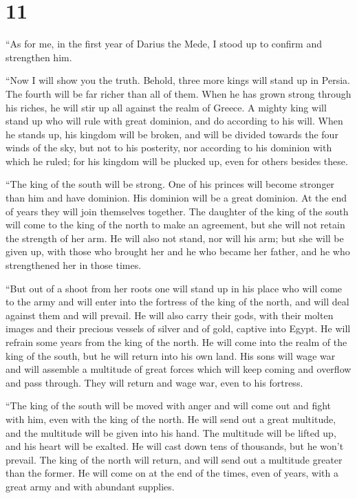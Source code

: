 \hypertarget{section-10}{%
\section{11}\label{section-10}}

 ``As for me, in the first year of Darius the Mede, I stood
up to confirm and strengthen him.

 ``Now I will show you the truth. Behold, three more kings
will stand up in Persia. The fourth will be far richer than all of them.
When he has grown strong through his riches, he will stir up all against
the realm of Greece.  A mighty king will stand up who will
rule with great dominion, and do according to his will. 
When he stands up, his kingdom will be broken, and will be divided
towards the four winds of the sky, but not to his posterity, nor
according to his dominion with which he ruled; for his kingdom will be
plucked up, even for others besides these.

 ``The king of the south will be strong. One of his princes
will become stronger than him and have dominion. His dominion will be a
great dominion.  At the end of years they will join
themselves together. The daughter of the king of the south will come to
the king of the north to make an agreement, but she will not retain the
strength of her arm. He will also not stand, nor will his arm; but she
will be given up, with those who brought her and he who became her
father, and he who strengthened her in those times.

 ``But out of a shoot from her roots one will stand up in
his place who will come to the army and will enter into the fortress of
the king of the north, and will deal against them and will prevail.
 He will also carry their gods, with their molten images and
their precious vessels of silver and of gold, captive into Egypt. He
will refrain some years from the king of the north.  He will
come into the realm of the king of the south, but he will return into
his own land.  His sons will wage war and will assemble a
multitude of great forces which will keep coming and overflow and pass
through. They will return and wage war, even to his fortress.

 ``The king of the south will be moved with anger and will
come out and fight with him, even with the king of the north. He will
send out a great multitude, and the multitude will be given into his
hand.  The multitude will be lifted up, and his heart will
be exalted. He will cast down tens of thousands, but he won't prevail.
 The king of the north will return, and will send out a
multitude greater than the former. He will come on at the end of the
times, even of years, with a great army and with abundant supplies.

